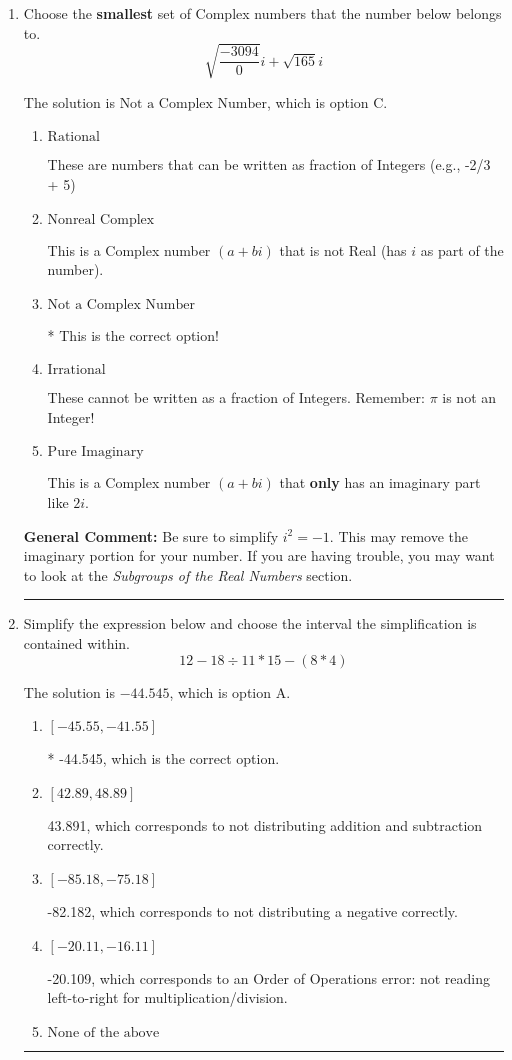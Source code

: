\documentclass{extbook}[14pt]
\newcommand{\litem}[1]{\item #1

\rule{\textwidth}{0.4pt}}
\begin{document}
\begin{enumerate}\litem{
Choose the \textbf{smallest} set of Complex numbers that the number below belongs to.
\[ \sqrt{\frac{-3094}{0}} i+\sqrt{165}i \]

The solution is \( \text{Not a Complex Number} \), which is option C.\begin{enumerate}[label=\Alph*.]
\item \( \text{Rational} \)

These are numbers that can be written as fraction of Integers (e.g., -2/3 + 5)
\item \( \text{Nonreal Complex} \)

This is a Complex number $(a+bi)$ that is not Real (has $i$ as part of the number).
\item \( \text{Not a Complex Number} \)

* This is the correct option!
\item \( \text{Irrational} \)

These cannot be written as a fraction of Integers. Remember: $\pi$ is not an Integer!
\item \( \text{Pure Imaginary} \)

This is a Complex number $(a+bi)$ that \textbf{only} has an imaginary part like $2i$.
\end{enumerate}

\textbf{General Comment:} Be sure to simplify $i^2 = -1$. This may remove the imaginary portion for your number. If you are having trouble, you may want to look at the \textit{Subgroups of the Real Numbers} section.
}
\litem{
Simplify the expression below and choose the interval the simplification is contained within.
\[ 12 - 18 \div 11 * 15 - (8 * 4) \]

The solution is \( -44.545 \), which is option A.\begin{enumerate}[label=\Alph*.]
\item \( [-45.55, -41.55] \)

* -44.545, which is the correct option.
\item \( [42.89, 48.89] \)

 43.891, which corresponds to not distributing addition and subtraction correctly.
\item \( [-85.18, -75.18] \)

 -82.182, which corresponds to not distributing a negative correctly.
\item \( [-20.11, -16.11] \)

 -20.109, which corresponds to an Order of Operations error: not reading left-to-right for multiplication/division.
\item \( \text{None of the above} \)


\end{enumerate}}
\end{enumerate}
\end{document}
